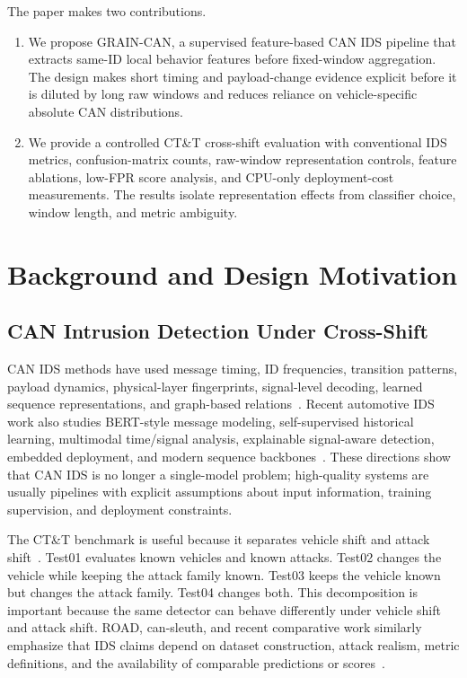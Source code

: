\documentclass[runningheads]{llncs}
\newcommand{\method}{GRAIN-CAN}
\begin{document}
The paper makes two contributions.
\begin{enumerate}
\item We propose \method{}, a supervised feature-based CAN IDS pipeline that extracts same-ID local behavior features before fixed-window aggregation. The design makes short timing and payload-change evidence explicit before it is diluted by long raw windows and reduces reliance on vehicle-specific absolute CAN distributions.
\item We provide a controlled CT\&T cross-shift evaluation with conventional IDS metrics, confusion-matrix counts, raw-window representation controls, feature ablations, low-FPR score analysis, and CPU-only deployment-cost measurements. The results isolate representation effects from classifier choice, window length, and metric ambiguity.
\end{enumerate}

\section{Background and Design Motivation}
\subsection{CAN Intrusion Detection Under Cross-Shift}
CAN IDS methods have used message timing, ID frequencies, transition patterns, payload dynamics, physical-layer fingerprints, signal-level decoding, learned sequence representations, and graph-based relations~\cite{song2016intrusion,taylor2016frequency,cho2016fingerprinting,cho2017viden,shahriar2022canshield,wang2023statgraph,song2024dgids}. Recent automotive IDS work also studies BERT-style message modeling, self-supervised historical learning, multimodal time/signal analysis, explainable signal-aware detection, embedded deployment, and modern sequence backbones~\cite{alkhatib2022canbert,zhuo2024histcan,kang2024canival,jeong2023xcanids,khandelwal2024fpga,liu2026mids}. These directions show that CAN IDS is no longer a single-model problem; high-quality systems are usually pipelines with explicit assumptions about input information, training supervision, and deployment constraints.

The CT\&T benchmark is useful because it separates vehicle shift and attack shift~\cite{lampe2024ctt}. Test01 evaluates known vehicles and known attacks. Test02 changes the vehicle while keeping the attack family known. Test03 keeps the vehicle known but changes the attack family. Test04 changes both. This decomposition is important because the same detector can behave differently under vehicle shift and attack shift. ROAD, can-sleuth, and recent comparative work similarly emphasize that IDS claims depend on dataset construction, attack realism, metric definitions, and the availability of comparable predictions or scores~\cite{verma2020road,kidmose2024cansleuth,guerra2024road,sharmin2024survey}.
\end{document}
